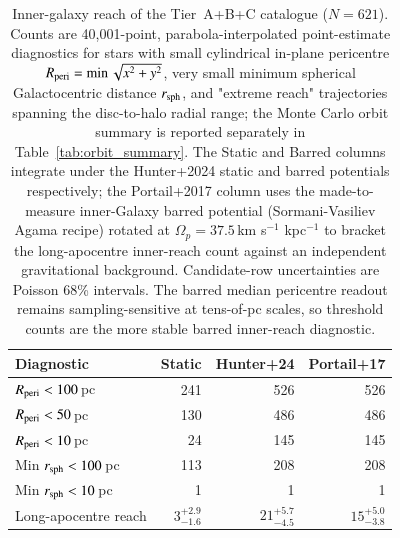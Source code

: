 \begin{table}[!htbp]
\caption{Inner-galaxy reach of the Tier~A+B+C
catalogue ($N=621$). Counts are 40{,}001-point, parabola-interpolated
point-estimate diagnostics for stars
with small cylindrical in-plane pericentre $R_{\mathrm{peri}}=\min\sqrt{x^2+y^2}$,
very small minimum spherical Galactocentric distance $r_{\rm sph}$, and
"extreme reach" trajectories spanning the disc-to-halo radial range; the
Monte Carlo orbit summary is reported separately in
Table~\ref{tab:orbit_summary}. The Static and Barred columns integrate
under the Hunter+2024 static and barred potentials respectively; the
Portail+2017 column uses the made-to-measure inner-Galaxy barred
potential (Sormani-Vasiliev Agama recipe) rotated at $\Omega_p=37.5$\,km
s$^{-1}$ kpc$^{-1}$ to bracket the long-apocentre inner-reach count against
an independent gravitational background. Candidate-row uncertainties are \citet{Gehrels1986}
Poisson 68\% intervals. The barred median pericentre readout remains
sampling-sensitive at tens-of-pc scales, so threshold counts are the more
stable barred inner-reach diagnostic.
\label{tab:reach}}
\centering
\small
\setlength{\tabcolsep}{0pt}
\begin{tabular*}{\columnwidth}{@{\extracolsep{\fill}}lrrr@{}}
\hline\hline
Diagnostic & Static & Hunter+24 & Portail+17 \\
\hline
$R_{\mathrm{peri}}<100$\,pc          & 241                & 526                & 526 \\
$R_{\mathrm{peri}}<50$\,pc           & 130                & 486                & 486 \\
$R_{\mathrm{peri}}<10$\,pc           & 24                 & 145                & 145 \\
Min $r_{\rm sph}<100$\,pc & 113                & 208                & 208 \\
Min $r_{\rm sph}<10$\,pc  & 1                  & 1                  & 1 \\
Long-apocentre reach      & $3^{+2.9}_{-1.6}$  & $21^{+5.7}_{-4.5}$ & $15^{+5.0}_{-3.8}$ \\
\hline
\end{tabular*}
\end{table}
